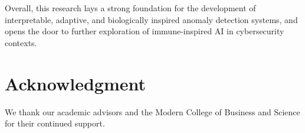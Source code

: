 \documentclass[conference]{IEEEtran}
\begin{document}
Overall, this research lays a strong foundation for the development
of interpretable, adaptive, and biologically inspired anomaly
detection systems, and opens the door to further exploration of
immune-inspired AI in cybersecurity contexts.

\section*{Acknowledgment}
We thank our academic advisors and the Modern College of Business and
Science for their continued support.

\printbibliography
\end{document}
